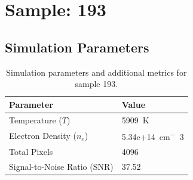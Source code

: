 \documentclass[a4paper,11pt]{article}
\begin{document}
\clearpage

\section{Sample: 193}
\subsection{Simulation Parameters}
\begin{table}[h!]
    \centering
    \begin{tabular}{ll}
        \toprule
        \textbf{Parameter} & \textbf{Value} \\
        \midrule
        Temperature ($T$) & 5909 \,\si{K} \\
        Electron Density ($n_e$) & 5.34e+14 \,\si{cm^-3} \\
        Total Pixels & 4096 \\
        Signal-to-Noise Ratio (SNR) & 37.52 \\
        \bottomrule
    \end{tabular}
    \caption{Simulation parameters and additional metrics for sample 193.}
    \label{tab:params_193}
\end{table}
\end{document}
